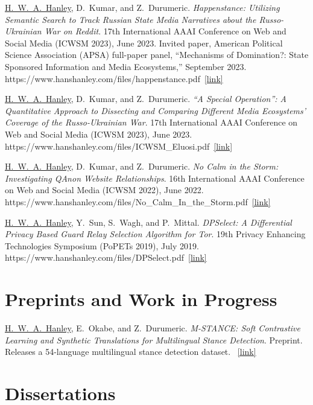 \documentclass[11pt,letterpaper]{article}
\newcommand{\pub}[4]{%
  \Needspace{3\baselineskip}%
  \item #1. \textit{#2}. #3.%
  \ifx\relax#4\relax\else\ \href{#4}{\small[link]}\fi
}
\newcommand{\me}{\underline{H.~W.~A.~Hanley}}
\begin{document}
\begin{pubs}
\pub{\me{}, D.~Kumar, and Z.~Durumeric}
    {Happenstance: Utilizing Semantic Search to Track Russian State Media Narratives about the Russo-Ukrainian War on Reddit}
    {17th International AAAI Conference on Web and Social Media (ICWSM 2023), June 2023.
     Invited paper, American Political Science Association (APSA) full-paper panel,
     ``Mechanisms of Domination?: State Sponsored Information and Media Ecosystems,'' September 2023}
    {https://www.hanshanley.com/files/happenstance.pdf}

\pub{\me{}, D.~Kumar, and Z.~Durumeric}
    {``A Special Operation'': A Quantitative Approach to Dissecting and Comparing Different Media Ecosystems' Coverage of the Russo-Ukrainian War}
    {17th International AAAI Conference on Web and Social Media (ICWSM 2023), June 2023}
    {https://www.hanshanley.com/files/ICWSM_Eluosi.pdf}

\pub{\me{}, D.~Kumar, and Z.~Durumeric}
    {No Calm in the Storm: Investigating QAnon Website Relationships}
    {16th International AAAI Conference on Web and Social Media (ICWSM 2022), June 2022}
    {https://www.hanshanley.com/files/No_Calm_In_the_Storm.pdf}

\pub{\me{}, Y.~Sun, S.~Wagh, and P.~Mittal}
    {DPSelect: A Differential Privacy Based Guard Relay Selection Algorithm for Tor}
    {19th Privacy Enhancing Technologies Symposium (PoPETs 2019), July 2019}
    {https://www.hanshanley.com/files/DPSelect.pdf}

\end{pubs}

\section{Preprints and Work in Progress}

\begin{pubs}
\pub{\me{}, E.~Okabe, and Z.~Durumeric}
    {M-STANCE: Soft Contrastive Learning and Synthetic Translations for Multilingual Stance Detection}
    {Preprint. Releases a 54-language multilingual stance detection dataset}
    {\relax}
\end{pubs}

\section{Dissertations}
\end{document}
